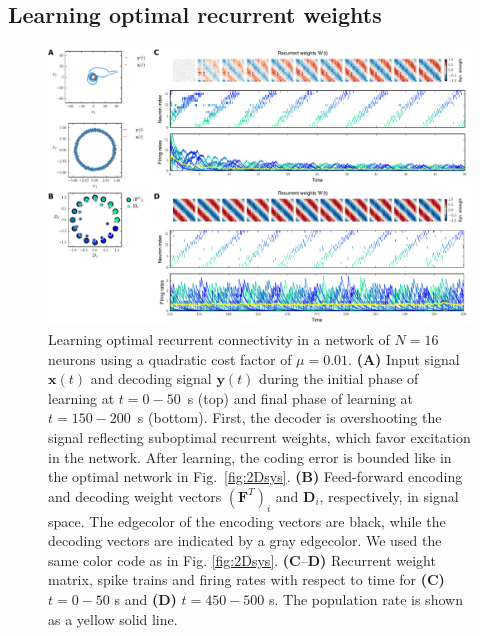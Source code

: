 \documentclass[twoside,twocolumn]{article}
\renewcommand{\b}[1]{\textbf{#1}}
\begin{document}
\subsection{Learning optimal recurrent weights}

 \begin{figure}[!ht]
  \includegraphics[width=\textwidth]{../plots/Fig4.pdf}
  \caption{Learning optimal recurrent connectivity in a network of $N=16$ neurons using a quadratic cost factor of $\mu=0.01$. \textbf{(A)} Input signal $\b{x}(t)$ and decoding signal $\b{y}(t)$ during the initial phase of learning at $t=0 - 50$~s (top) and final phase of learning at $t = 150-200$~s (bottom). First, the decoder is overshooting the signal reflecting suboptimal recurrent weights, which favor excitation in the network. After learning, the coding error is bounded like in the optimal network in Fig.~\ref{fig:2Dsys}. \textbf{(B)} Feed-forward encoding and decoding weight vectors $(\b{F}^T)_i$ and $\b{D}_i$, respectively, in signal space. The edgecolor of the encoding vectors are black, while the decoding vectors are indicated by a gray edgecolor. We used the same color code as in Fig. \ref{fig:2Dsys}. \textbf{(C}--\textbf{D)} Recurrent weight matrix, spike trains and firing rates with respect to time for \textbf{(C)} $t=0-50$ s and \textbf{(D)} $t=450-500$ s. The population rate is shown as a yellow solid line.}
  \label{fig:Learn}
\end{figure}
\end{document}
